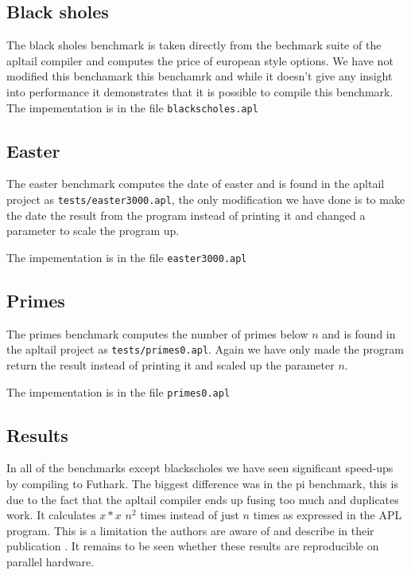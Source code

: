 \documentclass[11pt]{article}
\begin{document}
\subsection{Black sholes}
The black sholes benchmark is taken directly from the bechmark suite of the apltail compiler and computes the price of european style options. We have not modified this benchamark this benchamrk and while it doesn't give any insight into performance it demonstrates
that it is possible to compile this benchmark.
The impementation is in the file {\tt blackscholes.apl}
\subsection{Easter}
The easter benchmark computes the date of easter and is found in the apltail project as {\tt tests/easter3000.apl}, the only
modification we have done is to make the date the result from the program instead of printing it and changed a parameter to scale
the program up.

The impementation is in the file {\tt easter3000.apl}
\subsection{Primes}
The primes benchmark computes the number of primes below $n$ and is found in the apltail project as {\tt tests/primes0.apl}.
Again we have only made the program return the result instead of printing it and scaled up the parameter $n$.

The impementation is in the file {\tt primes0.apl}

\subsection{Results}

In all of the benchmarks except blackscholes we have seen significant speed-ups by compiling to Futhark.
The biggest difference was in the pi benchmark, this is due to the fact that the apltail compiler ends up fusing too much and
duplicates work. It calculates $x * x$ $n^2$ times instead of just $n$ times as expressed in the APL program.
This is a limitation the authors are aware of and describe in their publication \cite{Array:2015}.
It remains to be seen whether these results are reproducible on parallel hardware.
\end{document}
